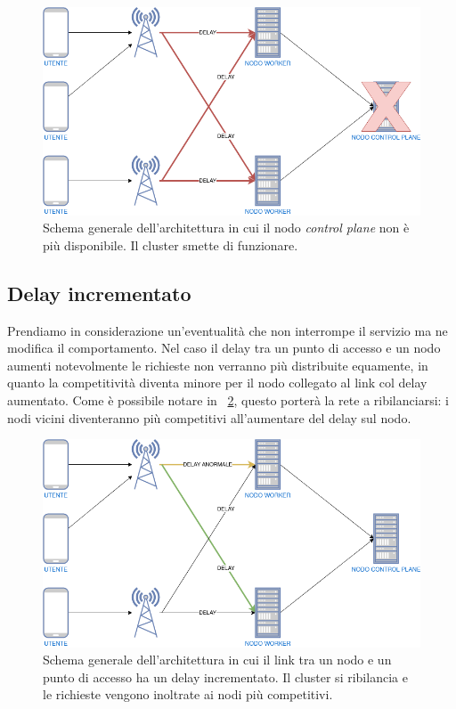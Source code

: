 \documentclass[12pt, hidelinks]{report}
\begin{document}
\begin{figure}[H]
    \centering
    \includegraphics[width=\linewidth]{11_anomalia-fallimento-control-plane.png}
    \caption{Schema generale dell'architettura in cui il nodo \textit{control plane} non è più disponibile. Il cluster smette di funzionare.}
    \label{fig:anomalia-fallimento-control-plane}
\end{figure}

\subsection{Delay incrementato}
Prendiamo in considerazione un'eventualità che non interrompe il servizio ma ne modifica il comportamento. Nel caso il delay tra un punto di accesso e un nodo aumenti notevolmente le richieste non verranno più distribuite equamente, in quanto la competitività diventa minore per il nodo collegato al link col delay aumentato. Come è possibile notare in \figurename~\ref{fig:anomalia-aumento-delay}, questo porterà la rete a ribilanciarsi: i nodi vicini diventeranno più competitivi all'aumentare del delay sul nodo. 

\begin{figure}[H]
    \centering
    \includegraphics[width=\linewidth]{12_anomalia-aumento-delay.png}
    \caption{Schema generale dell'architettura in cui il link tra un nodo e un punto di accesso ha un delay incrementato. Il cluster si ribilancia e le richieste vengono inoltrate ai nodi più competitivi.}
    \label{fig:anomalia-aumento-delay}
\end{figure}
\end{document}
